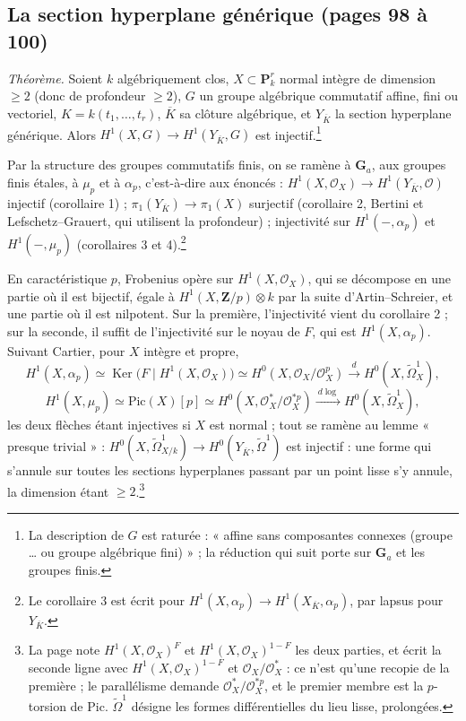 \documentclass[11pt,a4paper]{article}
\begin{document}
\subsection*{La section hyperplane générique (pages 98 à 100)}

\emph{Théorème.} Soient $k$ algébriquement clos, $X \subset \mathbf{P}^r_k$
normal intègre de dimension $\geq 2$ (donc de profondeur $\geq 2$), $G$ un
groupe algébrique commutatif affine, fini ou vectoriel, $K = k(t_1, \ldots, t_r)$,
$\overline{K}$ sa clôture algébrique, et $Y_{\overline{K}}$ la section
hyperplane générique. Alors $H^1(X, G) \to H^1(Y_{\overline{K}}, G)$ est
injectif.\footnote{La description de $G$ est raturée : « affine sans
composantes connexes (groupe … ou groupe algébrique fini) » ; la réduction qui
suit porte sur $\mathbf{G}_a$ et les groupes finis.}

Par la structure des groupes commutatifs finis, on se ramène à
$\mathbf{G}_a$, aux groupes finis étales, à $\mu_p$ et à $\alpha_p$, c'est-à-dire
aux énoncés : $H^1(X, \mathcal{O}_X) \to H^1(Y_{\overline{K}}, \mathcal{O})$
injectif (corollaire 1) ; $\pi_1(Y_{\overline{K}}) \to \pi_1(X)$ surjectif
(corollaire 2, Bertini et Lefschetz--Grauert, qui utilisent la profondeur) ;
injectivité sur $H^1(-, \alpha_p)$ et $H^1(-, \mu_p)$ (corollaires 3 et
4).\footnote{Le corollaire 3 est écrit pour
$H^1(X, \alpha_p) \to H^1(X_{\overline{K}}, \alpha_p)$, par lapsus pour
$Y_{\overline{K}}$.}

En caractéristique $p$, Frobenius opère sur $H^1(X, \mathcal{O}_X)$, qui se
décompose en une partie où il est bijectif, égale à
$H^1(X, \mathbf{Z}/p) \otimes k$ par la suite d'Artin--Schreier, et une partie
où il est nilpotent. Sur la première, l'injectivité vient du corollaire 2 ; sur
la seconde, il suffit de l'injectivité sur le noyau de $F$, qui est
$H^1(X, \alpha_p)$. Suivant Cartier, pour $X$ intègre et propre,
\[
H^1(X, \alpha_p) \simeq \operatorname{Ker}\bigl(F \mid H^1(X, \mathcal{O}_X)\bigr) \simeq H^0(X, \mathcal{O}_X/\mathcal{O}_X^p) \xrightarrow{\ d\ } H^0(X, \tilde{\Omega}^1_X),
\]
\[
H^1(X, \mu_p) \simeq \mathrm{Pic}(X)[p] \simeq H^0(X, \mathcal{O}^*_X/\mathcal{O}^{*p}_X) \xrightarrow{\ d\log\ } H^0(X, \tilde{\Omega}^1_X),
\]
les deux flèches étant injectives si $X$ est normal ; tout se ramène au lemme
« presque trivial » : $H^0(X, \tilde{\Omega}^1_{X/k}) \to H^0(Y_{\overline{K}}, \tilde{\Omega}^1)$
est injectif : une forme qui s'annule sur toutes les sections hyperplanes
passant par un point lisse s'y annule, la dimension étant
$\geq 2$.\footnote{La page note $H^1(X, \mathcal{O}_X)^F$ et
$H^1(X, \mathcal{O}_X)^{1-F}$ les deux parties, et écrit la seconde ligne avec
$H^1(X, \mathcal{O}_X)^{1-F}$ et $\mathcal{O}_X/\mathcal{O}^*_X$ : ce n'est
qu'une recopie de la première ; le parallélisme demande
$\mathcal{O}^*_X/\mathcal{O}^{*p}_X$, et le premier membre est la $p$-torsion
de $\mathrm{Pic}$. $\tilde{\Omega}^1$ désigne les formes différentielles du
lieu lisse, prolongées.}
\end{document}
